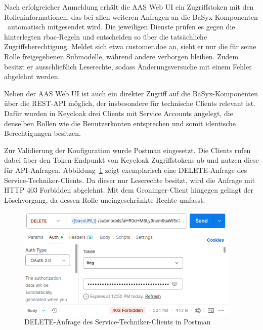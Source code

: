 \vspace{-0.35em}

Nach erfolgreicher Anmeldung erhält die AAS Web UI ein Zugriffstoken mit den Rolleninformationen, das bei allen weiteren Anfragen an die BaSyx-Komponenten%
\pagebreak
~automatisch mitgesendet wird.
Die jeweiligen Dienste prüfen es gegen die hinterlegten \acs{rbac}-Regeln und entscheiden so über die tatsächliche Zugriffsberechtigung.
Meldet sich etwa customer.doe an, sieht er nur die für seine Rolle freigegebenen Submodelle, während andere verborgen bleiben.
Zudem besitzt er ausschließlich Leserechte, sodass Änderungsversuche mit einem Fehler abgelehnt werden.

Neben der AAS Web UI ist auch ein direkter Zugriff auf die BaSyx-Komponenten über die REST-API möglich, der insbesondere für technische Clients relevant ist. 
Dafür wurden in Keycloak drei Clients mit Service Accounts angelegt, die denselben Rollen wie die Benutzerkonten entsprechen und somit identische Berechtigungen besitzen.

Zur Validierung der Konfiguration wurde Postman eingesetzt. 
Die Clients rufen dabei über den Token-Endpunkt von Keycloak Zugriffstokens ab und nutzen diese für API-Anfragen. 
Abbildung~\ref{fig:DELETEServiceTechniker} zeigt exemplarisch eine DELETE-Anfrage des Service-Techniker-Clients. 
Da dieser nur Leserechte besitzt, wird die Anfrage mit HTTP 403 Forbidden abgelehnt. 
Mit dem Groninger-Client hingegen gelingt der Löschvorgang, da dessen Rolle uneingeschränkte Rechte umfasst.

\begin{figure}[htbp]
    \centering
        \includegraphics[width=0.95\textwidth]{Bilder/Ergebnisse/DPP/Postman/TechnicianDelet.png}
    \caption{DELETE-Anfrage des Service-Techniker-Clients in Postman}
    \label{fig:DELETEServiceTechniker}
\end{figure}
\vspace{-0.25em}

